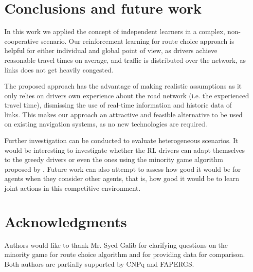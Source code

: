 \documentclass{RITA}
\begin{document}
\section{Conclusions and future work}
\label{sec:conclusions}

In this work we applied the concept of independent learners in a complex, non-cooperative scenario. Our reinforcement learning for route choice approach is helpful for either individual and global point of view, as drivers achieve reasonable travel times on average, and traffic is distributed over the network, as links does not get heavily congested.

The proposed approach has the advantage of making realistic assumptions as it only relies on drivers own experience about the road network (i.e. the experienced travel time), dismissing the use of real-time information and historic data of links. This makes our approach an attractive and feasible alternative to be used on existing navigation systems, as no new technologies are required.

Further investigation can be conducted to evaluate heterogeneous scenarios. It would be interesting to investigate whether the RL drivers can adapt themselves to the greedy drivers or even the ones using the minority game algorithm proposed by \cite{Galib&Moser2011}. Future work can also attempt to assess how good it would be for agents when they consider other agents, that is, how good it would be to learn joint actions in this competitive environment.

\section{Acknowledgments}

Authors would like to thank Mr. Syed Galib for clarifying questions on the minority game for route choice algorithm \cite{Galib&Moser2011} and for providing data for comparison. Both authors are partially supported by CNPq and FAPERGS. %


 
\end{document}
